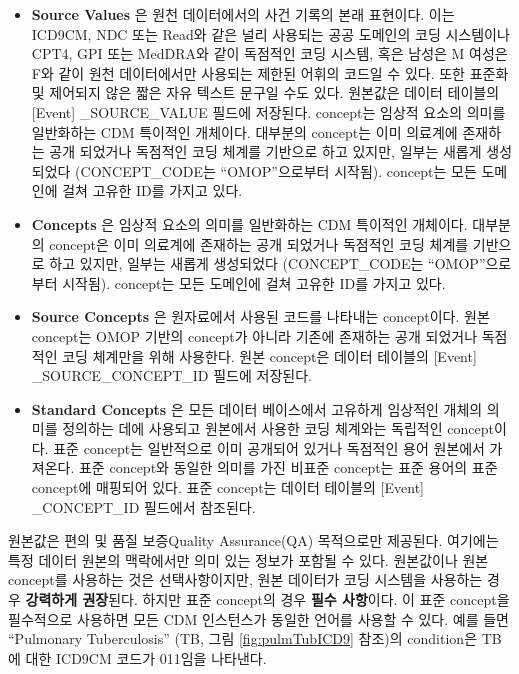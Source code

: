 \documentclass[11pt]{book}
\providecommand{\tightlist}{%
  \setlength{\itemsep}{0pt}\setlength{\parskip}{0pt}}
\theoremstyle{definition}
\theoremstyle{definition}
\theoremstyle{definition}
\theoremstyle{remark}
\begin{document}
\begin{itemize}
\tightlist
\item
  \textbf{Source Values} 은 원천 데이터에서의 사건 기록의 본래 표현이다.
  이는 ICD9CM, NDC 또는 Read와 같은 널리 사용되는 공공 도메인의 코딩
  시스템이나 CPT4, GPI 또는 MedDRA와 같이 독점적인 코딩 시스템, 혹은
  남성은 M 여성은 F와 같이 원천 데이터에서만 사용되는 제한된 어휘의
  코드일 수 있다. 또한 표준화 및 제어되지 않은 짧은 자유 텍스트 문구일
  수도 있다. 원본값은 데이터 테이블의 {[}Event{]} \_SOURCE\_VALUE 필드에
  저장된다. concept는 임상적 요소의 의미를 일반화하는 CDM 특이적인
  개체이다. 대부분의 concept는 이미 의료계에 존재하는 공개 되었거나
  독점적인 코딩 체계를 기반으로 하고 있지만, 일부는 새롭게 생성되었다
  (CONCEPT\_CODE는 ``OMOP''으로부터 시작됨). concept는 모든 도메인에
  걸쳐 고유한 ID를 가지고 있다.
\item
  \textbf{Concepts} 은 임상적 요소의 의미를 일반화하는 CDM 특이적인
  개체이다. 대부분의 concept은 이미 의료계에 존재하는 공개 되었거나
  독점적인 코딩 체계를 기반으로 하고 있지만, 일부는 새롭게 생성되었다
  (CONCEPT\_CODE는 ``OMOP''으로부터 시작됨). concept는 모든 도메인에
  걸쳐 고유한 ID를 가지고 있다.
\item
  \textbf{Source Concepts} 은 원자료에서 사용된 코드를 나타내는
  concept이다. 원본 concept는 OMOP 기반의 concept가 아니라 기존에
  존재하는 공개 되었거나 독점적인 코딩 체계만을 위해 사용한다. 원본
  concept은 데이터 테이블의 {[}Event{]} \_SOURCE\_CONCEPT\_ID 필드에
  저장된다.
\item
  \textbf{Standard Concepts} 은 모든 데이터 베이스에서 고유하게 임상적인
  개체의 의미를 정의하는 데에 사용되고 원본에서 사용한 코딩 체계와는
  독립적인 concept이다. 표준 concept는 일반적으로 이미 공개되어 있거나
  독점적인 용어 원본에서 가져온다. 표준 concept와 동일한 의미를 가진
  비표준 concept는 표준 용어의 표준 concept에 매핑되어 있다. 표준
  concept는 데이터 테이블의 {[}Event{]} \_CONCEPT\_ID 필드에서 참조된다.
\end{itemize}

원본값은 편의 및 품질 보증Quality Assurance(QA) 목적으로만 제공된다.
여기에는 특정 데이터 원본의 맥락에서만 의미 있는 정보가 포함될 수 있다.
원본값이나 원본 concept를 사용하는 것은 선택사항이지만, 원본 데이터가
코딩 시스템을 사용하는 경우 \textbf{강력하게 권장}된다. 하지만 표준
concept의 경우 \textbf{필수 사항}이다. 이 표준 concept을 필수적으로
사용하면 모든 CDM 인스턴스가 동일한 언어를 사용할 수 있다. 예를 들면
``Pulmonary Tuberculosis'' (TB, 그림 \ref{fig:pulmTubICD9} 참조)의
condition은 TB에 대한 ICD9CM 코드가 011임을 나타낸다.
\end{document}
